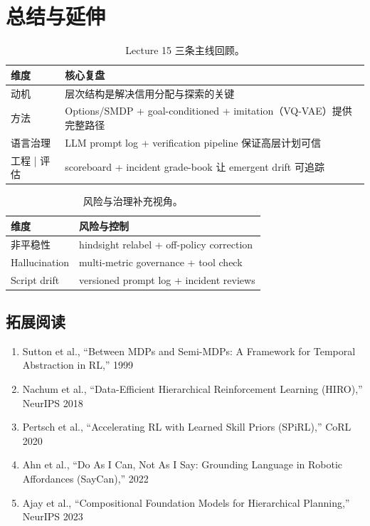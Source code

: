 \documentclass[a4paper]{article}
\begin{document}
\section{总结与延伸}

\begin{table}[H]
\centering
\begin{tabular}{p{3.5cm}p{8cm}}
\toprule
维度 & 核心复盘 \\
\midrule
动机 & 层次结构是解决信用分配与探索的关键 \\
方法 & Options/SMDP + goal-conditioned + imitation（VQ-VAE）提供完整路径 \\
语言治理 & LLM prompt log + verification pipeline 保证高层计划可信 \\
工程 | 评估 & scoreboard + incident grade-book 让 emergent drift 可追踪 \\
\bottomrule
\end{tabular}
\caption{Lecture 15 三条主线回顾。}
\end{table}

\begin{table}[H]
\centering
\begin{tabular}{p{3.5cm}p{8cm}}
\toprule
维度 & 风险与控制 \\
\midrule
非平稳性 & hindsight relabel + off-policy correction \\
Hallucination & multi-metric governance + tool check \\
Script drift & versioned prompt log + incident reviews \\
\bottomrule
\end{tabular}
\caption{风险与治理补充视角。}
\end{table}

\subsection{拓展阅读}
\begin{enumerate}
    \item Sutton et al., ``Between MDPs and Semi-MDPs: A Framework for Temporal Abstraction in RL,'' 1999
    \item Nachum et al., ``Data-Efficient Hierarchical Reinforcement Learning (HIRO),'' NeurIPS 2018
    \item Pertsch et al., ``Accelerating RL with Learned Skill Priors (SPiRL),'' CoRL 2020
    \item Ahn et al., ``Do As I Can, Not As I Say: Grounding Language in Robotic Affordances (SayCan),'' 2022
    \item Ajay et al., ``Compositional Foundation Models for Hierarchical Planning,'' NeurIPS 2023
\end{enumerate}
\end{document}
